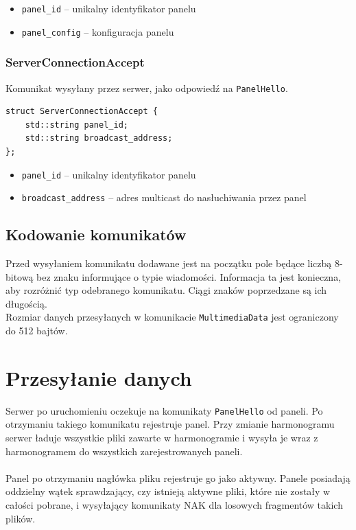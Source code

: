 \documentclass[12pt, a4paper]{article}
\providecommand{\tightlist}{%
  \setlength{\itemsep}{0pt}\setlength{\parskip}{0pt}}
\begin{document}
\begin{itemize}
\tightlist
    \item \texttt{panel\_id} -- unikalny identyfikator panelu
    \item \texttt{panel\_config} -- konfiguracja panelu
\end{itemize}

\hypertarget{server-connection-accept}{%
\subsubsection{ServerConnectionAccept}\label{server-connection-accept}}

Komunikat wysyłany przez serwer, jako odpowiedź na \texttt{PanelHello}.

\begin{verbatim}
struct ServerConnectionAccept {
    std::string panel_id;
    std::string broadcast_address;
};
\end{verbatim}

\begin{itemize}
\tightlist
    \item \texttt{panel\_id} -- unikalny identyfikator panelu
    \item \texttt{broadcast\_address} -- adres multicast do nasłuchiwania przez panel
\end{itemize}

\hypertarget{kodowanie-komunikatow}{%
\subsection{Kodowanie komunikatów}\label{kodowanie-komunikatow}}

Przed wysyłaniem komunikatu dodawane jest na początku pole będące liczbą 8-bitową bez znaku informujące o typie wiadomości. Informacja ta jest konieczna, aby rozróżnić typ odebranego komunikatu. Ciągi znaków poprzedzane są ich długością. 
\\
Rozmiar danych przesyłanych w komunikacie \texttt{MultimediaData} jest ograniczony do 512 bajtów. 

\hypertarget{przesyux142anie-danych}{%
\section{Przesyłanie danych}\label{przesyux142anie-danych}}


Serwer po uruchomieniu oczekuje na komunikaty \texttt{PanelHello} od paneli. Po otrzymaniu takiego komunikatu rejestruje panel. Przy zmianie harmonogramu serwer ładuje wszystkie pliki zawarte w harmonogramie i wysyła je wraz z harmonogramem do wszystkich zarejestrowanych paneli.
\\
\\
Panel po otrzymaniu nagłówka pliku rejestruje go jako aktywny. Panele posiadają oddzielny wątek sprawdzający, czy istnieją aktywne pliki, które nie zostały w całości pobrane, i wysyłający komunikaty NAK dla losowych fragmentów takich plików.
\end{document}
